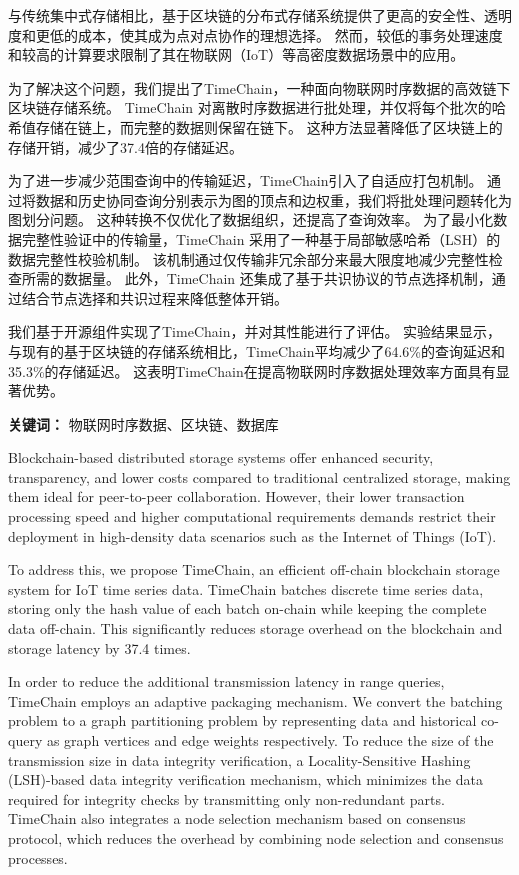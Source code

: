 \cleardoublepage
{}
与传统集中式存储相比，基于区块链的分布式存储系统提供了更高的安全性、透明度和更低的成本，使其成为点对点协作的理想选择。
然而，较低的事务处理速度和较高的计算要求限制了其在物联网（IoT）等高密度数据场景中的应用。

为了解决这个问题，我们提出了TimeChain，一种面向物联网时序数据的高效链下区块链存储系统。
TimeChain 对离散时序数据进行批处理，并仅将每个批次的哈希值存储在链上，而完整的数据则保留在链下。
这种方法显著降低了区块链上的存储开销，减少了37.4倍的存储延迟。

为了进一步减少范围查询中的传输延迟，TimeChain引入了自适应打包机制。
通过将数据和历史协同查询分别表示为图的顶点和边权重，我们将批处理问题转化为图划分问题。
这种转换不仅优化了数据组织，还提高了查询效率。
为了最小化数据完整性验证中的传输量，TimeChain 采用了一种基于局部敏感哈希（LSH）的数据完整性校验机制。
该机制通过仅传输非冗余部分来最大限度地减少完整性检查所需的数据量。
此外，TimeChain 还集成了基于共识协议的节点选择机制，通过结合节点选择和共识过程来降低整体开销。

我们基于开源组件实现了TimeChain，并对其性能进行了评估。
实验结果显示，与现有的基于区块链的存储系统相比，TimeChain平均减少了64.6\%的查询延迟和35.3\%的存储延迟。
这表明TimeChain在提高物联网时序数据处理效率方面具有显著优势。

{\noindent \textbf{关键词：} 物联网时序数据、区块链、数据库}

\cleardoublepage
{}
Blockchain-based distributed storage systems offer enhanced security, transparency, and lower costs compared to traditional centralized storage, making them ideal for peer-to-peer collaboration. 
However, their lower transaction processing speed and higher computational requirements demands restrict their deployment in high-density data scenarios such as the Internet of Things (IoT).

To address this, we propose TimeChain, an efficient off-chain blockchain storage system for IoT time series data.
TimeChain batches discrete time series data, storing only the hash value of each batch on-chain while keeping the complete data off-chain. 
This significantly reduces storage overhead on the blockchain and storage latency by 37.4 times. 

In order to reduce the additional transmission latency in range queries, TimeChain employs an adaptive packaging mechanism. 
We convert the batching problem to a graph partitioning problem by representing data and historical co-query as graph vertices and edge weights respectively.
To reduce the size of the transmission size in data integrity verification, a Locality-Sensitive Hashing (LSH)-based data integrity verification mechanism, which minimizes the data required for integrity checks by transmitting only non-redundant parts. 
TimeChain also integrates a node selection mechanism based on consensus protocol, which reduces the overhead by combining node selection and consensus processes.

